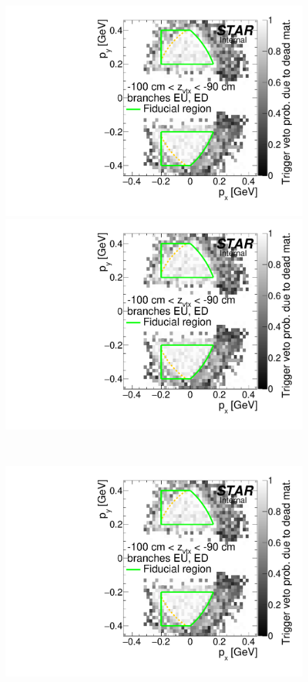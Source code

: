 \begin{figure}[hb]\ContinuedFloat
\centering
\parbox{0.495\textwidth}{
  \centering
  \includegraphics[width=\linewidth,page=15]{graphics/corrections/mcDeadMatProbPxPy.pdf}\\
  \includegraphics[width=\linewidth,page=17]{graphics/corrections/mcDeadMatProbPxPy.pdf}
}~
\parbox{0.495\textwidth}{
  \centering
  \includegraphics[width=\linewidth,page=16]{graphics/corrections/mcDeadMatProbPxPy.pdf}\\
}
\end{figure}
